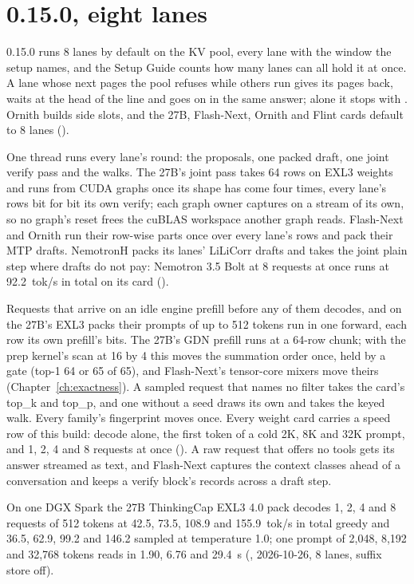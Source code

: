 \section{0.15.0, eight lanes}\label{sec:changelog-0150}

0.15.0 runs 8 lanes by default on the KV pool, every lane with the window the setup names, and the Setup Guide counts how many lanes can all hold it at once. A lane whose next pages the pool refuses while others run gives its pages back, waits at the head of the line and goes on in the same answer; alone it stops with . Ornith builds side slots, and the 27B, Flash-Next, Ornith and Flint cards default to 8 lanes (\measured).

One thread runs every lane's round: the proposals, one packed draft, one joint verify pass and the walks. The 27B's joint pass takes 64 rows on EXL3 weights and runs from CUDA graphs once its shape has come four times, every lane's rows bit for bit its own verify; each graph owner captures on a stream of its own, so no graph's reset frees the cuBLAS workspace another graph reads. Flash-Next and Ornith run their row-wise parts once over every lane's rows and pack their MTP drafts. NemotronH packs its lanes' LiLiCorr drafts and takes the joint plain step where drafts do not pay: Nemotron 3.5 Bolt at 8 requests at once runs at 92.2~tok/s in total on its card (\measured).

Requests that arrive on an idle engine prefill before any of them decodes, and on the 27B's EXL3 packs their prompts of up to 512 tokens run in one forward, each row its own prefill's bits. The 27B's GDN prefill runs at a 64-row chunk; with the prep kernel's scan at 16 by 4 this moves the summation order once, held by a gate (top-1 64 or 65 of 65), and Flash-Next's tensor-core mixers move theirs (Chapter~\ref{ch:exactness}). A sampled request that names no filter takes the card's top\_k and top\_p, and one without a seed draws its own and takes the keyed walk. Every family's fingerprint moves once. Every weight card carries a speed row of this build: decode alone, the first token of a cold 2K, 8K and 32K prompt, and 1, 2, 4 and 8 requests at once (\measured). A raw request that offers no tools gets its answer streamed as text, and Flash-Next captures the context classes ahead of a conversation and keeps a verify block's records across a draft step.

On one DGX Spark the 27B ThinkingCap EXL3 4.0 pack decodes 1, 2, 4 and 8 requests of 512 tokens at 42.5, 73.5, 108.9 and 155.9~tok/s in total greedy and 36.5, 62.9, 99.2 and 146.2 sampled at temperature 1.0; one prompt of 2,048, 8,192 and 32,768 tokens reads in 1.90, 6.76 and 29.4~s (\measured, 2026-10-26, 8 lanes, suffix store off).

